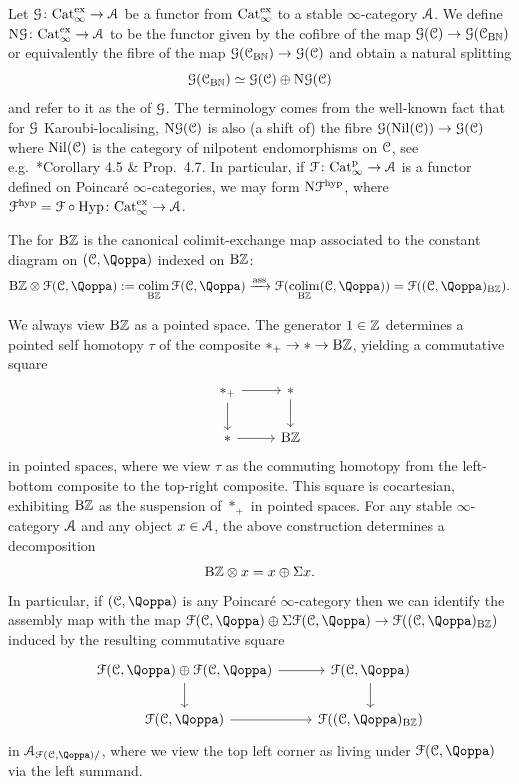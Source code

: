\begin{construction}
\label{construction:nil}%
\label{remark:splitting}%
Let $\mathcal{G}\colon \mathrm{Cat}_\infty^{\mathrm{ex}} \to \mathcal{A}$ be a functor from $\mathrm{Cat}_\infty^{\mathrm{ex}}$ to a stable $\infty$-category $\mathcal{A}$. We define
$\mathrm{N}\mathcal{G}\colon \mathrm{Cat}_\infty^{\mathrm{ex}} \to \mathcal{A}$ to be the functor given by the cofibre of the map
$\mathcal{G}(\mathcal C) \to \mathcal{G}(\mathcal C_{\mathrm{B} \mathbb{N}})$ or equivalently the fibre of the map $\mathcal{G}(\mathcal C_{\mathrm{B}\mathbb{N}}) \to \mathcal{G}(\mathcal C)$ and obtain a natural splitting 
\[
\mathcal{G}(\mathcal C_{\mathrm{B}\mathbb{N}}) \simeq \mathcal{G}(\mathcal C) \oplus \mathrm{N}\mathcal{G}(\mathcal C)
\]
and refer to it as the  of $\mathcal{G}$. The terminology comes from the well-known fact that for $\mathcal{G}$ Karoubi-localising, $\mathrm{N}\mathcal{G}(\mathcal C)$ is also (a shift of) the fibre $\mathcal{G}(\mathrm{Nil}(\mathcal C)) \to \mathcal{G}(\mathcal C)$ where $\mathrm{Nil}(\mathcal C)$ is the category of nilpotent endomorphisms on $\mathcal C$, see e.g.\ \cite{LT2}*{Corollary 4.5 \& Prop.\ 4.7}.
In particular, if $\mathcal{F}\colon \mathrm{Cat}^{\mathrm p}_\infty \to \mathcal{A}$ is a functor defined on Poincaré $\infty$-categories, we may form $\mathrm{N}\mathcal{F}^{\mathrm{hyp}}$, where $\mathcal{F}^{\mathrm{hyp}} = \mathcal{F} \circ \operatorname{Hyp}\colon \mathrm{Cat}_\infty^{\mathrm{ex}} \to \mathcal{A}$.
\end{construction}






\begin{definition}
\label{definition:assembly}%
The  for $\mathrm{B}\mathbb{Z}$ is the canonical colimit-exchange map associated to the constant diagram on $(\C,\QF)$ indexed on $\mathrm{B}\mathbb{Z}$:
\[
{\B\ZZ} \otimes \F(\C,\QF) := \colim\limits_{\B\ZZ} \F(\C,\QF) \xrightarrow{\ass} \F(\colim\limits_{\B\ZZ} (\C,\QF)) = \F((\C,\QF)_{\B\ZZ}).
\]
\end{definition}


\begin{remark}
\label{remark:circle-decompose-1}%
We always view $\mathrm{B}\mathbb{Z}$ as a pointed space.
The generator $1 \in \mathbb{Z}$ determines a pointed self homotopy $\tau$ of the composite $\ast_+ \to \ast \to \mathrm{B}\mathbb{Z}$, yielding a commutative square
\[
\begin{tikzcd}
*_+ \ar[r]\ar[d] & \ast \ar[d] \\
* \ar[r] & \B\ZZ 
\end{tikzcd}
\]
in pointed spaces, where we view $\tau$ as the commuting homotopy from the left-bottom composite to the top-right composite. This square is cocartesian, exhibiting $\mathrm{B}\mathbb{Z}$ as the suspension of $*_+$ in pointed spaces. 
For any stable $\infty$-category $\mathcal{A}$ and any object $x \in \mathcal{A}$, the above construction 
determines a decomposition
\[
\mathrm{B}\mathbb{Z} \otimes x = x \oplus \Sigma x .
\]
In particular, if $(\C,\QF)$ is any Poincaré $\infty$-category then we can identify the assembly map with the map $\F(\C,\QF) \oplus \Sig\F(\C,\QF) \to \F((\C,\QF)_{\B\ZZ})$ induced by the resulting commutative square
\[
\begin{tikzcd}
\F(\C,\QF)\oplus \F(\C,\QF) \ar[r]\ar[d] & \F(\C,\QF) \ar[d] \\
\F(\C,\QF) \ar[r] & \F((\C,\QF)_{\B\ZZ}) 
\end{tikzcd}
\]
in $\A_{\F(\C,\QF)/}$, where we view the top left corner as living under $\F(\C,\QF)$ via the left summand.
\end{remark}




